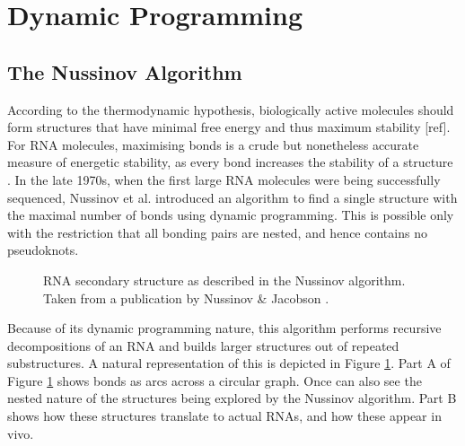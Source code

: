 \documentclass[12pt, a4paper]{article}
\begin{document}
\section{Dynamic Programming}
\subsection{The Nussinov Algorithm}
According to the thermodynamic hypothesis, biologically active molecules should form structures that have minimal free energy and thus maximum stability [ref]. For RNA molecules, maximising bonds is a crude but nonetheless accurate measure of energetic stability, as every bond increases the
stability of a structure \cite{nussinov1978algorithms}. In the late 1970s, when the first large RNA molecules
were being successfully sequenced, Nussinov et al. \cite{nussinov1978algorithms} introduced an algorithm to find a single structure with the maximal number of bonds using dynamic programming. This is possible only with the restriction that all bonding pairs are nested, and hence contains no pseudoknots.

\begin{figure}
\begin{center}
\end{center}
\caption{RNA secondary structure as described in the Nussinov algorithm.
Taken from a publication by Nussinov \& Jacobson \cite{nussinov1980fast}.}
\label{nuss_rna}
\end{figure}


Because of its dynamic programming nature, this algorithm performs recursive decompositions of an RNA and builds
larger structures out of repeated substructures. A natural representation of this is
depicted in Figure \ref{nuss_rna}. Part A of Figure \ref{nuss_rna} shows bonds as arcs across a circular
graph. Once can also see the nested nature of the structures being explored by the
Nussinov algorithm. Part B shows how these structures translate to actual RNAs,
and how these appear in vivo.
\end{document}

